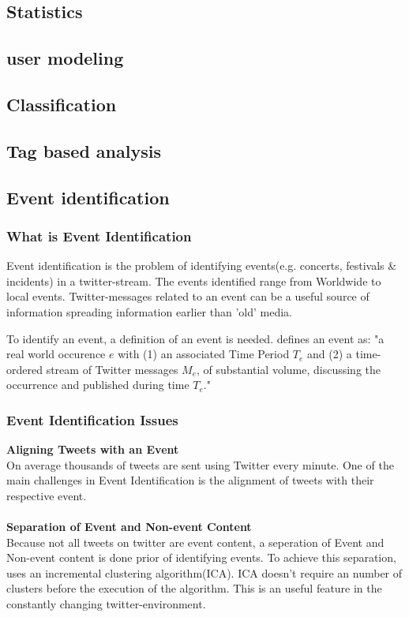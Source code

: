 \documentclass{article}
\begin{document}
\subsection{Statistics}
\subsection{user modeling}
\subsection{Classification}
\subsection{Tag based analysis}
\subsection{Event identification}
\subsubsection{What is Event Identification}
Event identification is the problem of identifying events(e.g. concerts, festivals \& incidents) in a twitter-stream. The events identified range from Worldwide to local events. Twitter-messages related to an event can be a useful source of information spreading information earlier than 'old' media.

To identify an event, a definition of an event is needed. \cite{eventident} defines an event as: "a real world occurence $e$ with (1) an associated Time Period $T_e$ and (2) a time-ordered stream of Twitter messages $M_e$, of substantial volume, discussing the
occurrence and published during time $T_e$."

\subsubsection{Event Identification Issues}

\textbf{Aligning Tweets with an Event} \\
On average thousands of tweets are sent using Twitter every minute. One of the main challenges in Event Identification is the alignment of tweets with their respective event. 
\\\\
\textbf{Separation of Event and Non-event Content}\\
Because not all tweets on twitter are event content, a seperation of Event and Non-event content is done prior of identifying events. To achieve this separation, \cite{eventident} uses an incremental clustering algorithm(ICA). ICA doesn't require an number of clusters before the execution of the algorithm. This is an useful feature in the constantly changing twitter-environment.
\end{document}
